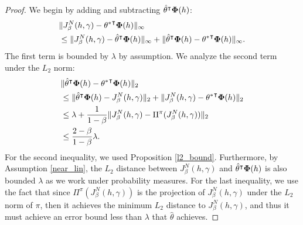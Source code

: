 \documentclass[letterpaper, 10 pt, conference]{ieeeconf}  %
\theoremstyle{definition}
\theoremstyle{remark}
\begin{document}
\begin{proof}
We begin by adding and subtracting $\hat{\theta}^\intercal {\bf \Phi}(h)$:
\begin{align*}
&\|J_\beta^N(h,\gamma) - {\theta^*}^\intercal {\bf \Phi}(h)\|_\infty\\
& \leq \| J_\beta^N(h,\gamma) - \hat{\theta}^\intercal {\bf \Phi}(h)\|_\infty+ \| \hat{\theta}^\intercal {\bf \Phi}(h) -  {\theta^*}^\intercal {\bf \Phi}(h)\|_\infty.
\end{align*}
The first term is bounded by $\lambda$ by assumption. We analyze the second term under the $L_2$ norm:
\begin{align*}
 &\| \hat{\theta}^\intercal {\bf \Phi}(h) -  {\theta^*}^\intercal {\bf \Phi}(h)\|_2 \\
 &\leq   \| \hat{\theta}^\intercal {\bf \Phi}(h) - J_\beta^N(h,\gamma)\|_2 + \|J_\beta^N(h,\gamma) - {\theta^*}^\intercal {\bf \Phi}(h)\|_2\\
 &\leq \lambda + \frac{1}{1-\beta}   \|J_\beta^N(h,\gamma) - \Pi^\pi (J_\beta^N(h,\gamma) ) \|_2\\
 &\leq \frac{2-\beta}{1-\beta}\lambda.
\end{align*}
For the second inequality, we used Proposition \ref{l2_bound}. Furthermore, by Assumption \ref{near_lin}, the $L_2$ distance between $J_\beta^N(h,\gamma)$ and  $\hat{\theta}^\intercal {\bf \Phi}(h)$ is also bounded $\lambda$ as we work under probability measures. For the last inequality,  we use the fact that since $ \Pi^\pi (J_\beta^N(h,\gamma) ) $ is the projection of  $J_\beta^N(h,\gamma)$ under the $L_2$ norm of $\pi$, then it achieves the minimum $L_2$ distance to $J_\beta^N(h,\gamma)$, and thus it must achieve an error bound less than $\lambda$ that $\hat{\theta}$ achieves. 


\end{proof}
\end{document}
